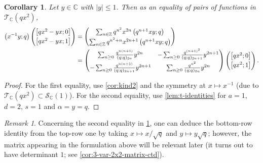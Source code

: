 \documentclass[reqno,11pt]{amsart}
\newtheorem{corollary}[theorem]{Corollary}
\theoremstyle{definition}
\theoremstyle{remark}
\newtheorem*{remark}{Remark}
\numberwithin{equation}{section}
\newcommand{\Z}{\mathbb{Z}}
\newcommand{\C}{\mathbb{C}}
\newcommand{\mT}{\mathcal{T}}
\newcommand{\mS}{\mathcal{S}}
\newcommand{\vect}[2]{\big[{#1};{#2}\big]}
\begin{document}
\begin{corollary} \label{cor:3-var-2x2-matrix}
Let $y \in \C$ with $|y| \le 1$. Then as an equality of pairs of functions in $\mT_\C\left(qx^2\right)$,
\[
    \begin{aligned}
    \left(x^{-1} y; q\right) 
    \begin{pmatrix}
    \vect{qx^2 - yx}{0} \vspace{0.1cm} \\ 
    \vect{qx^2 - yx}{1} 
    \end{pmatrix}
    &=
    \begin{pmatrix}
    \sum_{n \in \Z}
        q^{n^2} x^{2n} \left(q^{n+1}xy; q\right)
    \vspace{0.1cm} \\
    \sum_{n \in \Z}
        q^{n^2+n} x^{2n+1} \left(q^{n+1}xy; q\right)
    \end{pmatrix}
    \\
    &=
    \begin{pmatrix}
    \sum_{n \ge 0} \frac{q^{n(n+1)}}{(q; q)_{2n}} y^{2n}
    & 
    - \sum_{n \ge 0} \frac{q^{(n+1)^2}}{(q; q)_{2n+1}} y^{2n+1}
    \vspace{0.1cm} \\
    -\sum_{n \ge 0} \frac{q^{n(n+1)}}{(q; q)_{2n+1}} y^{2n+1}
    &
    \sum_{n \ge 0} \frac{q^{n^2}}{(q; q)_{2n}} y^{2n}
    \end{pmatrix}
    \begin{pmatrix}
    \vect{qx^2}{0} \vspace{0.1cm} \\
    \vect{qx^2}{1} 
    \end{pmatrix}.
    \end{aligned}
\]
\end{corollary}

\begin{proof}
For the first equality, use \cref{cor:kind2} and the symmetry at $x \mapsto x^{-1}$ (due to $\mT_\C\left(qx^2\right) \subset \mS_\C(1)$). For the second equality, use \cref{lem:t-identities} for $a = 1$, $d = 2$, $s = 1$ and $\alpha = y = q$.
\end{proof}

\begin{remark}
Concerning the second equality in \cref{cor:3-var-2x2-matrix}, one can deduce the bottom-row identity from the top-row one by taking $x \mapsto x/\sqrt{q}$ and $y \mapsto y\sqrt{q}$; however, the matrix appearing in the formulation above will be relevant later (it turns out to have determinant $1$; see \cref{cor:3-var-2x2-matrix-ctd}).
\end{remark}
\end{document}
